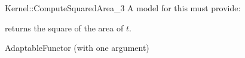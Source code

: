 \begin{ccRefFunctionObjectConcept}{Kernel::ComputeSquaredArea_3}
A model for this must provide:


       {returns the square of the area of $t$. }

\ccRefines
AdaptableFunctor (with one argument)

\ccSeeAlso
{}\\

\end{ccRefFunctionObjectConcept}
